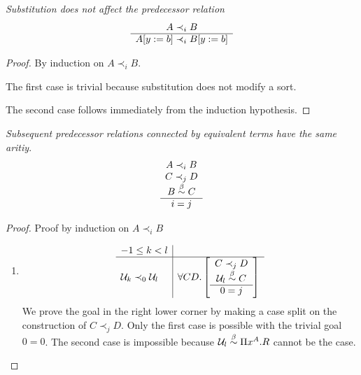 \begin{lemma}
    \label{PrecedenceSubstitution}
    \emph{Substitution does not affect the predecessor relation}
    $$
    \begin{array}{c} A \prec_i B \\ \hline A[y:=b] \prec_i B[y:=b]\end{array}
    $$

    \begin{proof}
        By induction on $A \prec_i B$.

        The first case is trivial because substitution does not modify a sort.

        The second case follows immediately from the induction hypothesis.
    \end{proof}
\end{lemma}



\begin{lemma}
    \label{PrecedenceSameArity}
    \emph{Subsequent predecessor relations connected by equivalent terms have
    the same aritiy}.
    $$
    \begin{array}{c} 
        A \prec_i B
        \\
        C \prec_j D
        \\
        B \stackrel{\beta}{\sim} C
     \\ \hline 
        i = j
    \end{array}
    $$

    \begin{proof}
        Proof by induction on $A \prec_i B$
        \begin{enumerate}
        \item
            $$
            \begin{array}{l|l}
                -1 \le k < l
                \\
                \hline
                {\cal U}_k \prec_0 {\cal U}_l
                &
                \forall C D.
                \left[
                \begin{array}{c} 
                    C \prec_j D
                    \\
                    {\cal U}_l \stackrel{\beta}{\sim} C
                 \\ \hline 0 = j\end{array}
                \right]
            \end{array}
            $$
            We prove the goal in the right lower corner by making a case split
            on the construction of $C \prec_j D$. Only the first case
            is possible with the trivial goal $0 = 0$. The second case is
            impossible because ${\cal U}_l \stackrel{\beta}{\sim} \Pi x^A. R$ cannot be the case.


\end{enumerate}
\end{proof}
\end{lemma}
